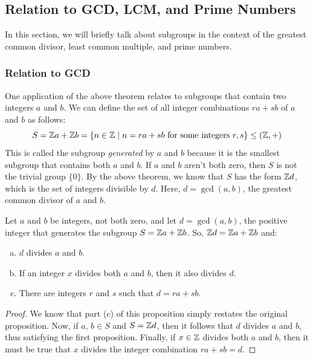 \documentclass[letterpaper]{article}
\begin{document}
\subsection{Relation to GCD, LCM, and Prime Numbers}
In this section, we will briefly talk about subgroups in the context of the greatest common divisor, least common multiple, and prime numbers. 

\subsubsection{Relation to GCD}
One application of the above theorem relates to subgroups that contain two integers $a$ and $b$. We can define the set of all integer combinations $ra + sb$ of $a$ and $b$ as follows: 
\[S = \mathbb{Z} a + \mathbb{Z} b = \{n \in \mathbb{Z} \mid n = ra + sb \text{ for some integers } r, s\} \leq (\mathbb{Z}, +)\]
This is called the subgroup \emph{generated} by $a$ and $b$ because it is the smallest subgroup that contains both $a$ and $b$. If $a$ and $b$ aren't both zero, then $S$ is not the trivial group $\{0\}$. By the above theorem, we know that $S$ has the form $\mathbb{Z} d$, which is the set of integers divisible by $d$. Here, $d = \gcd(a, b)$, the greatest common divisor of $a$ and $b$. 
\begin{mdframed}
    \begin{proposition}
        Let $a$ and $b$ be integers, not both zero, and let $d = \gcd(a, b)$, the positive integer that generates the subgroup $S = \mathbb{Z} a + \mathbb{Z} b$. So, $\mathbb{Z} d = \mathbb{Z} a + \mathbb{Z} b$ and: 
        \begin{enumerate}[(a)]
            \item $d$ divides $a$ and $b$. 
            \item If an integer $x$ divides both $a$ and $b$, then it also divides $d$. 
            \item There are integers $r$ and $s$ such that $d = ra + sb$. 
        \end{enumerate}
    \end{proposition}
\end{mdframed}

\begin{mdframed}
    \begin{proof}
        We know that part (c) of this proposition simply restates the original proposition. Now, if $a$, $b \in S$ and $S = \mathbb{Z} d$, then it follows that $d$ divides $a$ and $b$, thus satisfying the first proposition. Finally, if $x \in \mathbb{Z}$ divides both $a$ and $b$, then it must be true that $x$ divides the integer combination $ra + sb = d$. 
    \end{proof}
\end{mdframed}
\end{document}
